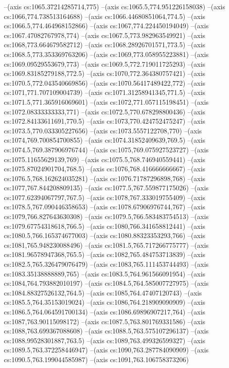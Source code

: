 --(axis cs:1065.37214285714,775)
--(axis cs:1065.5,774.951226158038)
--(axis cs:1066,774.738513164688)
--(axis cs:1066.44680851064,774.5)
--(axis cs:1066.5,774.464968152866)
--(axis cs:1067,774.224450194049)
--(axis cs:1067.47082767978,774)
--(axis cs:1067.5,773.982963549921)
--(axis cs:1068,773.664679582712)
--(axis cs:1068.28926701571,773.5)
--(axis cs:1068.5,773.353369763206)
--(axis cs:1069,773.058955223881)
--(axis cs:1069.09529553679,773)
--(axis cs:1069.5,772.719011725293)
--(axis cs:1069.83185279188,772.5)
--(axis cs:1070,772.364380757421)
--(axis cs:1070.5,772.043540669856)
--(axis cs:1070.56417489422,772)
--(axis cs:1071,771.707109004739)
--(axis cs:1071.31258941345,771.5)
--(axis cs:1071.5,771.365916069601)
--(axis cs:1072,771.057115198451)
--(axis cs:1072.08333333333,771)
--(axis cs:1072.5,770.678298800436)
--(axis cs:1072.84133611691,770.5)
--(axis cs:1073,770.424752475247)
--(axis cs:1073.5,770.033305227656)
--(axis cs:1073.5557122708,770)
--(axis cs:1074,769.700854700855)
--(axis cs:1074.31852409639,769.5)
--(axis cs:1074.5,769.387906976744)
--(axis cs:1075,769.075927523727)
--(axis cs:1075.11655629139,769)
--(axis cs:1075.5,768.746940559441)
--(axis cs:1075.87024901704,768.5)
--(axis cs:1076,768.416666666667)
--(axis cs:1076.5,768.162624035281)
--(axis cs:1076.71787296898,768)
--(axis cs:1077,767.844208809135)
--(axis cs:1077.5,767.559877175026)
--(axis cs:1077.62394067797,767.5)
--(axis cs:1078,767.333019755409)
--(axis cs:1078.5,767.090446358653)
--(axis cs:1078.67906976744,767)
--(axis cs:1079,766.827643630308)
--(axis cs:1079.5,766.583483754513)
--(axis cs:1079.67754318618,766.5)
--(axis cs:1080,766.341658812441)
--(axis cs:1080.5,766.165374677003)
--(axis cs:1080.88323353293,766)
--(axis cs:1081,765.948230088496)
--(axis cs:1081.5,765.717266775777)
--(axis cs:1081.96578947368,765.5)
--(axis cs:1082,765.484753713839)
--(axis cs:1082.5,765.326479076479)
--(axis cs:1083,765.111453744493)
--(axis cs:1083.35138888889,765)
--(axis cs:1083.5,764.961566091954)
--(axis cs:1084,764.793882010197)
--(axis cs:1084.5,764.585007727975)
--(axis cs:1084.88327526132,764.5)
--(axis cs:1085,764.47407120743)
--(axis cs:1085.5,764.35153019024)
--(axis cs:1086,764.218909090909)
--(axis cs:1086.5,764.064591700134)
--(axis cs:1086.69896907217,764)
--(axis cs:1087,763.90115098172)
--(axis cs:1087.5,763.801769331586)
--(axis cs:1088,763.699367088608)
--(axis cs:1088.5,763.575107296137)
--(axis cs:1088.99528301887,763.5)
--(axis cs:1089,763.499326599327)
--(axis cs:1089.5,763.372258446947)
--(axis cs:1090,763.287784090909)
--(axis cs:1090.5,763.199044585987)
--(axis cs:1091,763.106758373206)

